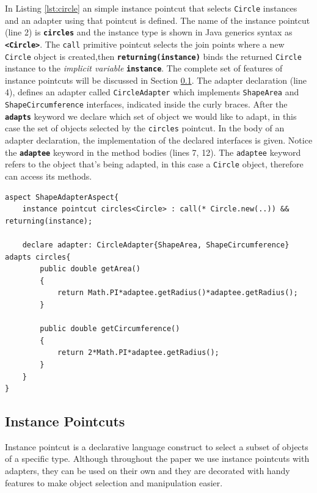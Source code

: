 \documentclass{llncs}
\begin{document}
In Listing \ref{lst:circle} an simple instance pointcut that selects \texttt{Circle} instances and an adapter using that pointcut is defined. The name of the instance pointcut (line 2) is \textbf{\texttt{circles}} and the instance type is shown in Java generics syntax as \texttt{\textbf{<Circle>}}. The \texttt{call} primitive pointcut selects the join points where a new \texttt{Circle} object is created,then \texttt{\textbf{returning(instance)}} binds the returned \texttt{Circle} instance to the \emph{implicit variable} \texttt{\textbf{instance}}. The complete set of features of instance pointcuts will be discussed in Section \ref{sec:ip}. The adapter declaration (line 4), defines an adapter called \texttt{CircleAdapter} which implements \texttt{ShapeArea} and \texttt{ShapeCircumference} interfaces, indicated inside the curly braces. After the \texttt{\textbf{adapts}} keyword we declare which set of object we would like to adapt, in this case the set of objects selected by the \texttt{circles} pointcut. In the body of an adapter declaration, the implementation of the declared interfaces is given. Notice the \texttt{\textbf{adaptee}} keyword in the method bodies (lines 7, 12). The \texttt{adaptee} keyword refers to the object that's being adapted, in this case a \texttt{Circle} object, therefore can access its methods. 

\begin{lstlisting}[float=tb, caption={An instance pointcut selecting Circle objects and an adapter declaration using this pointcut}, label={lst:circle}]
aspect ShapeAdapterAspect{
	instance pointcut circles<Circle> : call(* Circle.new(..)) && returning(instance);

	declare adapter: CircleAdapter{ShapeArea, ShapeCircumference} adapts circles{
		public double getArea()
		{
			return Math.PI*adaptee.getRadius()*adaptee.getRadius();
		}
				
		public double getCircumference()
		{
			return 2*Math.PI*adaptee.getRadius();
		}
	}
}
\end{lstlisting}

\subsection{Instance Pointcuts}
\label{sec:ip}
Instance pointcut is a declarative language construct to select a subset of objects of a specific type. Although throughout the paper we use instance pointcuts with adapters, they can be used on their own and they are decorated with handy features to make object selection and manipulation easier.
\end{document}

